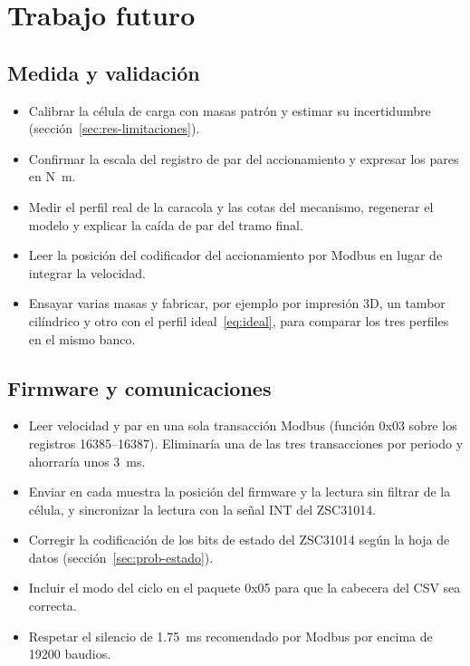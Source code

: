\section{Trabajo futuro}

\subsection{Medida y validación}
\begin{itemize}
  \item Calibrar la célula de carga con masas patrón y estimar su incertidumbre
        (sección~\ref{sec:res-limitaciones}).
  \item Confirmar la escala del registro de par del accionamiento y expresar los pares en
        \si{\newton\metre}.
  \item Medir el perfil real de la caracola y las cotas del mecanismo, regenerar el modelo y explicar
        la caída de par del tramo final.
  \item Leer la posición del codificador del accionamiento por Modbus en lugar de integrar la velocidad.
  \item Ensayar varias masas y fabricar, por ejemplo por impresión 3D, un tambor cilíndrico y otro con el
        perfil ideal~\eqref{eq:ideal}, para comparar los tres perfiles en el mismo banco.
\end{itemize}

\subsection{Firmware y comunicaciones}
\begin{itemize}
  \item Leer velocidad y par en una sola transacción Modbus (función 0x03 sobre los registros
        16385--16387). Eliminaría una de las tres transacciones por periodo y ahorraría unos
        \SI{3}{\milli\second}.
  \item Enviar en cada muestra la posición del firmware y la lectura sin filtrar de la célula, y
        sincronizar la lectura con la señal INT del ZSC31014.
  \item Corregir la codificación de los bits de estado del ZSC31014 según la hoja de datos
        (sección~\ref{sec:prob-estado}).
  \item Incluir el modo del ciclo en el paquete 0x05 para que la cabecera del CSV sea correcta.
  \item Respetar el silencio de \SI{1.75}{\milli\second} recomendado por Modbus por encima de
        19200 baudios.
\end{itemize}

